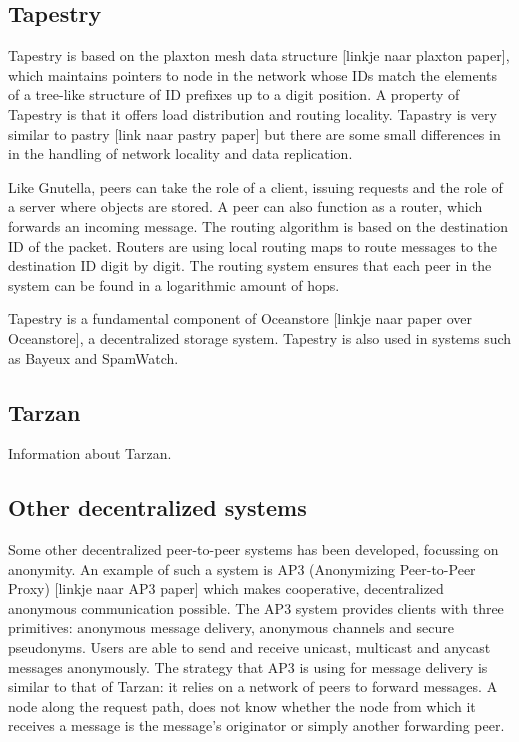\documentclass[journal]{IEEEtran}
\begin{document}
		\subsection{Tapestry}
			Tapestry is based on the plaxton mesh data structure [linkje naar plaxton paper], which maintains pointers to node in the network whose IDs match the elements of a tree-like structure of ID prefixes up to a digit position. A property of Tapestry is that it offers load distribution and routing locality. Tapastry is very similar to pastry [link naar pastry paper] but there are some small differences in in the handling of network locality and data replication.
		
			Like Gnutella, peers can take the role of a client, issuing requests and the role of a server where objects are stored. A peer can also function as a router, which forwards an incoming message. The routing algorithm is based on the destination ID of the packet. Routers are using local routing maps to route messages to the destination ID digit by digit. The routing system ensures that each peer in the system can be found in a logarithmic amount of hops.
		
			Tapestry is a fundamental component of Oceanstore [linkje naar paper over Oceanstore], a decentralized storage system. Tapestry is also used in systems such as Bayeux and SpamWatch.
		
		\subsection{Tarzan}
			Information about Tarzan.
		
		\subsection{Other decentralized systems}
			Some other decentralized peer-to-peer systems has been developed, focussing on anonymity. An example of such a system is AP3 (Anonymizing Peer-to-Peer Proxy) [linkje naar AP3 paper] which makes cooperative, decentralized anonymous communication possible. The AP3 system provides clients with three primitives: anonymous message delivery, anonymous channels and secure pseudonyms. Users are able to send and receive unicast, multicast and anycast messages anonymously. The strategy that AP3 is using for message delivery is similar to that of Tarzan: it relies on a network of peers to forward messages. A node along the request path, does not know whether the node from which it receives a message is the message's originator or simply another forwarding peer.
			
\end{document}
